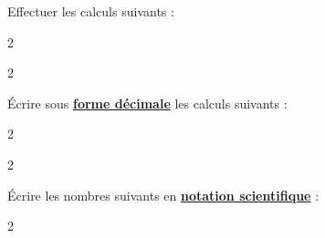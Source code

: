 \documentclass[12pt,a4paper]{exam}
\begin{document}
\begin{questions}

    \question[3]Effectuer les calculs suivants :
    \begin{multicols}{2}
    \end{multicols}
    \begin{multicols}{2}
    \end{multicols}

    \question[3]Écrire sous \underline{\textbf{forme décimale}} les calculs suivants :
    \begin{multicols}{2}
    \end{multicols}
    \begin{multicols}{2}
    \end{multicols}

    \question[3]Écrire les nombres suivants en \underline{\textbf{notation scientifique}} :
    \begin{multicols}{2}
        \begin{parts}

\end{parts}
\end{multicols}
\end{questions}
\end{document}
